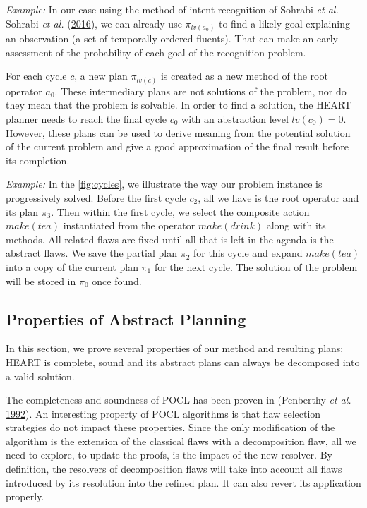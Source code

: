 \documentclass[11pt,a4paper,twoside,openright,titlepage,numbers=noenddot,headinclude,cleardoublepage=empty,openany]{scrreprt}
\theoremstyle{plain}
\theoremstyle{definition}
\theoremstyle{remark}
\begin{document}
\emph{Example:} In our case using the method of intent recognition of
Sohrabi \emph{et al.} Sohrabi \emph{et al.}
(\protect\hyperlink{ref-sohrabi_plan_2016}{2016}), we can already use
\(\pi_{lv(a_0)}\) to find a likely goal explaining an observation (a set
of temporally ordered fluents). That can make an early assessment of the
probability of each goal of the recognition problem.

For each cycle \(c\), a new plan \(\pi_{lv(c)}\) is created as a new
method of the root operator \(a_0\). These intermediary plans are not
solutions of the problem, nor do they mean that the problem is solvable.
In order to find a solution, the HEART planner needs to reach the final
cycle \(c_0\) with an abstraction level \(lv(c_0) = 0\). However, these
plans can be used to derive meaning from the potential solution of the
current problem and give a good approximation of the final result before
its completion.

\emph{Example:} In the \cref{fig:cycles}, we illustrate the way our
problem instance is progressively solved. Before the first cycle
\(c_2\), all we have is the root operator and its plan \(\pi_3\). Then
within the first cycle, we select the composite action \(make(tea)\)
instantiated from the operator \(make(drink)\) along with its methods.
All related flaws are fixed until all that is left in the agenda is the
abstract flaws. We save the partial plan \(\pi_2\) for this cycle and
expand \(make(tea)\) into a copy of the current plan \(\pi_1\) for the
next cycle. The solution of the problem will be stored in \(\pi_0\) once
found.

\hypertarget{properties-of-abstract-planning}{%
\subsection{Properties of Abstract
Planning}\label{properties-of-abstract-planning}}

In this section, we prove several properties of our method and resulting
plans: HEART is complete, sound and its abstract plans can always be
decomposed into a valid solution.

The completeness and soundness of POCL has been proven in (Penberthy
\emph{et al.} \protect\hyperlink{ref-penberthy_ucpop_1992}{1992}). An
interesting property of POCL algorithms is that flaw selection
strategies do not impact these properties. Since the only modification
of the algorithm is the extension of the classical flaws with a
decomposition flaw, all we need to explore, to update the proofs, is the
impact of the new resolver. By definition, the resolvers of
decomposition flaws will take into account all flaws introduced by its
resolution into the refined plan. It can also revert its application
properly.
\end{document}
